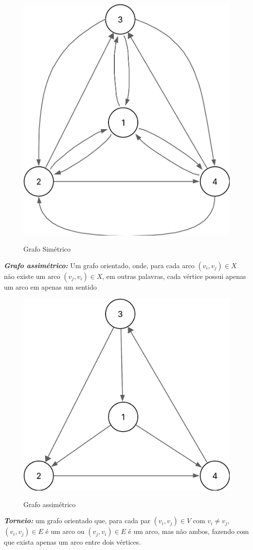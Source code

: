 \begin{figure} [H]
	\centering
	\caption{Grafo Simétrico}%
	\label{fig:grafSimetrico}%
	\includegraphics[width=0.5\linewidth,angle=0]{figuras/tiposgrafos/grafSimetrico.png}%
	\\
\end{figure}
\textit{\textbf{Grafo assimétrico:}}  Um grafo orientado, onde, para cada arco $ (v_i, v_j) \in X$ não existe um arco $ (v_j,v_i)\in X $, em outras palavras, cada vértice possui apenas um arco em apenas um sentido \\
\begin{figure} [H]
	\centering
	\caption{Grafo assimétrico}%
	\label{fig:grafAssimet}%
	\includegraphics[width=0.5\linewidth,angle=0]{figuras/tiposgrafos/grafAssimet.png}%
	\\
\end{figure}
\textit{\textbf{Torneio:}} um grafo orientado que, para cada par $ (v_i, v_j) \in V $ com $ v_i \neq v_j $, $ (v_i, v_j)\in E $ é um arco ou $ (v_j, v_i) \in E $ é um arco, mas não ambos, fazendo com que exista apenas um arco entre dois vértices.
